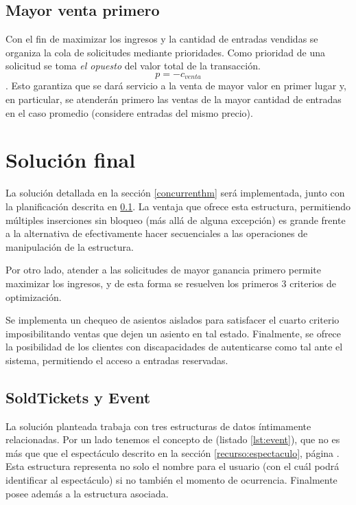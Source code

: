 \subsection{Mayor venta primero}\label{mayor-primero}

Con el fin de maximizar los ingresos y la cantidad de entradas vendidas se organiza la cola de solicitudes mediante prioridades.
Como prioridad de una solicitud se toma \emph{el opuesto} del valor total de la transacción.
\[ p = -c_{venta}\].
Esto garantiza que se dará servicio a la venta de mayor valor en primer lugar y, en particular,
se atenderán primero las ventas de la mayor cantidad de entradas en el caso promedio (considere entradas del mismo precio).




\section{Solución final}

La solución detallada en la sección \ref{concurrenthm} será implementada, junto con la planificación descrita en \ref{mayor-primero}.
La ventaja que ofrece esta estructura, permitiendo múltiples inserciones sin bloqueo (más allá de alguna excepción)
es grande frente a la alternativa de efectivamente hacer secuenciales a las operaciones de manipulación de la estructura.

Por otro lado, atender a las solicitudes de mayor ganancia primero permite maximizar los ingresos,
y de esta forma se resuelven los primeros 3 criterios de optimización.

Se implementa un chequeo de asientos aislados para satisfacer el cuarto criterio imposibilitando ventas que dejen un asiento en tal estado.
Finalmente, se ofrece la posibilidad de los clientes con discapacidades de autenticarse como tal ante el sistema,
permitiendo el acceso a entradas reservadas.

\subsection{SoldTickets y Event}

La solución planteada trabaja con tres estructuras de datos íntimamente relacionadas.
Por un lado tenemos el concepto de  (listado \ref{lst:event}), que no es más que que el espectáculo descrito en la sección \ref{recurso:espectaculo}, página \pageref{recurso:espectaculo}.
Esta estructura representa no solo el nombre para el usuario (con el cuál podrá identificar al espectáculo) si no también el momento de ocurrencia.
Finalmente posee además a la estructura  asociada.

